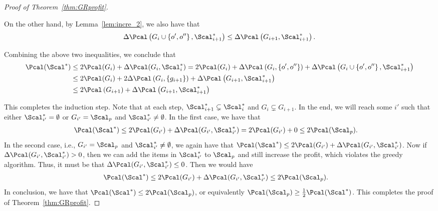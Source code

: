 \begin{proof}[Proof of Theorem~\ref{thm:GRprofit}]
\begin{itemize}
	On the other hand, by Lemma~\ref{lem:incre_2}, we also have that 
	\begin{align*}
	\Delta\Pcal\left(G_i\cup\left\{o',o''\right\},\Scal_{i+1}^*\right)\le \Delta\Pcal\left(G_{i+1},\Scal^*_{i+1}\right).
	\end{align*}
	
	Combining the above two inequalities, we conclude that
	\begin{align*}
	\Pcal(\Scal^*) &\le 2\Pcal(G_i) + \Delta\Pcal(G_i,\Scal^*_i)=  2\Pcal(G_i) + \Delta\Pcal\left(G_i,\left\{o',o''\right\}\right) + \Delta\Pcal\left(G_i\cup \left\{o',o''\right\},\Scal^*_{i+1}\right)\\
	&\le 2\Pcal(G_i) + 2\Delta\Pcal\left(G_i,\left\{g_{i+1}\right\}\right) + \Delta\Pcal\left(G_{i+1},\Scal^*_{i+1}\right)\\
	&\le 2\Pcal\left(G_{i+1}\right) + \Delta\Pcal\left(G_{i+1},\Scal^*_{i+1}\right)
	\end{align*}	
\end{itemize}
This completes the induction step. Note that at each step, $\Scal^*_{i+1}\subsetneq \Scal^*_i$ and $G_i\subsetneq G_{i+1}$. In the end, we will reach some $i'$ such that either $\Scal^*_{i'}=\emptyset$ or $G_{i'} = \Scal_p$ and $\Scal^*_{i'}\ne \emptyset$. In the first case, we have that
\begin{align*}
\Pcal(\Scal^*)&\le 2\Pcal(G_{i'}) + \Delta\Pcal(G_{i'},\Scal^*_{i'}) = 2\Pcal(G_{i'}) + 0\le 2\Pcal(\Scal_p).
\end{align*}
In the second case, i.e., $G_{i'} = \Scal_p$ and $\Scal^*_{i'}\ne \emptyset$, we again have that $\Pcal(\Scal^*)\le 2\Pcal(G_{i'}) + \Delta\Pcal(G_{i'},\Scal^*_{i'})$. Now if $ \Delta\Pcal(G_{i'},\Scal^*_{i'})>0$, then we can add the items in $\Scal^*_{i'}$ to $\Scal_p$ and still increase the profit, which violates the greedy algorithm. Thus, it must be that $\Delta\Pcal(G_{i'},\Scal^*_{i'})\le 0$. Then we would have
\begin{align*}
\Pcal(\Scal^*)&\le 2\Pcal(G_{i'}) + \Delta\Pcal(G_{i'},\Scal^*_{i'}) \le 2\Pcal(\Scal_p).
\end{align*}
In conclusion, we have that $\Pcal(\Scal^*)\le 2\Pcal(\Scal_p)$, or equivalently $\Pcal(\Scal_p)\ge \frac{1}{2}\Pcal(\Scal^*)$. This completes the proof of Theorem~\ref{thm:GRprofit}.    
\end{proof}







